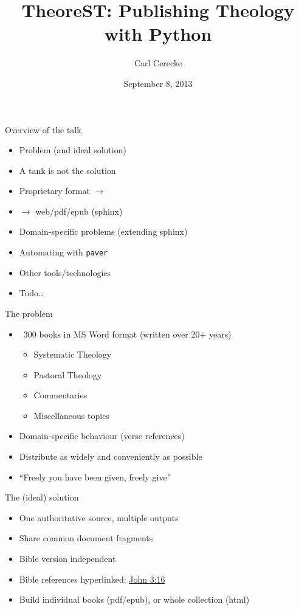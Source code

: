 \documentclass{beamer}
\title{TheoreST: Publishing Theology with Python}
\author{Carl Cerecke}
\institute{Evangelical Bible College of Western Australia}
\date{September 8, 2013}
\begin{document}
    \begin{frame}[plain]
        \titlepage
    \end{frame}

\begin{frame}{Overview of the talk}
    \begin{itemize}
    \item Problem (and ideal solution)
    \item A tank is not the solution
    \item Proprietary format $\rightarrow$ \rst
    \item \rst $\rightarrow$ web/pdf/epub (sphinx)
    \item Domain-specific problems (extending sphinx)
    \item Automating with \texttt{paver}
    \item Other tools/technologies
    \item Todo\ldots
    \end{itemize}
\end{frame}
    
\begin{frame}{The problem}
    \begin{itemize}
    \item ~300 books in MS Word format (written over 20+ years)
        \begin{itemize}
        \item Systematic Theology
        \item Pastoral Theology
        \item Commentaries
        \item Miscellaneous topics 
        \end{itemize}
    \item Domain-specific behaviour (verse references)
    \item Distribute as widely and conveniently as possible
    \item ``Freely you have been given, freely give''
    \end{itemize}
\end{frame}
    
\begin{frame}{The (ideal) solution}
\begin{itemize}
    \item One authoritative source, multiple outputs
    \item Share common document fragments
    \item Bible version independent
    \item Bible references hyperlinked: \href{http://some.url}{John 3:16}
    \item Build individual books (pdf/epub), or whole collection (html)
\end{itemize}
\end{frame}
    
\end{document}
